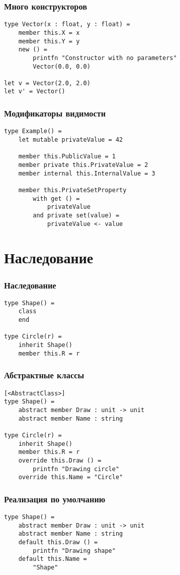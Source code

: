 \documentclass[xetex,mathserif,serif]{beamer}
\begin{document}
	\begin{frame}[fragile]
		\frametitle{Много конструкторов}
		\begin{verbatim}
type Vector(x : float, y : float) = 
    member this.X = x
    member this.Y = y
    new () = 
        printfn "Constructor with no parameters"
        Vector(0.0, 0.0)

let v = Vector(2.0, 2.0)
let v' = Vector()
		\end{verbatim}
\end{frame}

	\begin{frame}[fragile]
		\frametitle{Модификаторы видимости}
		\begin{verbatim}
type Example() = 
    let mutable privateValue = 42

    member this.PublicValue = 1
    member private this.PrivateValue = 2
    member internal this.InternalValue = 3

    member this.PrivateSetProperty 
        with get () = 
            privateValue 
        and private set(value) = 
            privateValue <- value
		\end{verbatim}
\end{frame}

	\section{Наследование}

	\begin{frame}[fragile]
		\frametitle{Наследование}
		\begin{verbatim}
type Shape() =
    class
    end

type Circle(r) =
    inherit Shape()
    member this.R = r
		\end{verbatim}
\end{frame}

	\begin{frame}[fragile]
		\frametitle{Абстрактные классы}
		\begin{verbatim}
[<AbstractClass>]
type Shape() =
    abstract member Draw : unit -> unit
    abstract member Name : string

type Circle(r) =
    inherit Shape()
    member this.R = r
    override this.Draw () = 
        printfn "Drawing circle"
    override this.Name = "Circle"
		\end{verbatim}
\end{frame}

	\begin{frame}[fragile]
		\frametitle{Реализация по умолчанию}
		\begin{verbatim}
type Shape() =
    abstract member Draw : unit -> unit
    abstract member Name : string
    default this.Draw () =
        printfn "Drawing shape"
    default this.Name =
        "Shape"
		\end{verbatim}
\end{frame}
\end{document}
